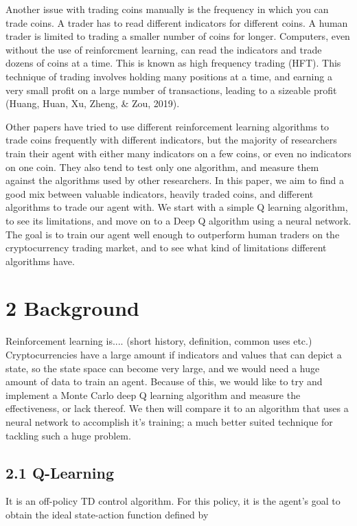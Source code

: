 \documentclass[letterpaper]{article}
\begin{document}
Another issue with trading coins manually is the frequency in which you can trade coins. A trader has to read different indicators for different coins. A human trader is limited to trading a smaller number of coins for longer. Computers, even without the use of reinforcment learning, can read the indicators and trade dozens of coins at a time. This is known as high frequency trading (HFT). This technique of trading involves holding many positions at a time, and earning a very small profit on a large number of transactions, leading to a sizeable profit (Huang, Huan, Xu, Zheng, \& Zou, 2019).

Other papers have tried to use different reinforcement learning algorithms to trade coins frequently with different indicators, but the majority of researchers train their agent with either many indicators on a few coins, or even no indicators on one coin. They also tend to test only one algorithm, and measure them against the algorithms used by other researchers. In this paper, we aim to find a good mix between valuable indicators, heavily traded coins, and different algorithms to trade our agent with. We start with a simple Q learning algorithm, to see its limitations, and move on to a Deep Q algorithm using a neural network. The goal is to train our agent well enough to outperform human traders on the cryptocurrency trading market, and to see what kind of limitations different algorithms have.

\section{2 Background}
Reinforcement learning is.... (short history, definition, common uses etc.)
Cryptocurrencies have a large amount if indicators and values that can depict a state, so the state space can become very large, and we would need a huge amount of data to train an agent. Because of this, we would like to try and implement a Monte Carlo deep Q learning algorithm and measure the effectiveness, or lack thereof. We then will compare it to an algorithm that uses a neural network to accomplish it's training; a much better suited technique for tackling such a huge problem.

\subsection{2.1 Q-Learning}
It is an off-policy TD control algorithm. For this policy, it is the agent's goal to obtain the ideal state-action function defined by
\end{document}
